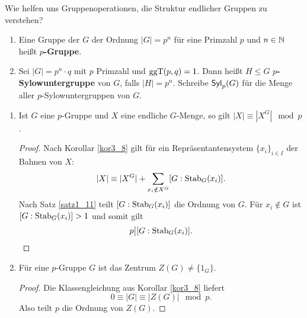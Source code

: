 \begin{leftbar}
	{Wie helfen uns Gruppenoperationen, die Struktur endlicher Gruppen zu verstehen?}
\end{leftbar}
\begin{definition}\label{definiton3_10}
	\begin{enumerate}[label=(\alph*)]
		\item Eine Gruppe der $G$ der Ordnung $|G| = p^n$ für eine Primzahl $p$ und $n \in \mathbb{N}$ heißt \textbf{$p$-Gruppe}.
		\item Sei $|G| = p^n \cdot q$ mit $p$ Primzahl und $\mathrm{ggT}(p,q) = 1$. Dann heißt $H \leq G$ \textbf{$p$-Sylowuntergruppe} von $G$, falls $|H| = p^n$. Schreibe $\mathsf{Syl}_p(G)$ für die Menge aller $p$-Sylowuntergruppen von $G$.
	\end{enumerate}
\end{definition}
\begin{rem}\label{rem3_11}
\begin{enumerate}[label=(\roman*)]
	\item 	Ist $G$ eine $p$-Gruppe und $X$ eine endliche $G$-Menge, so gilt $|X| \equiv |X^G| \mod p$.
	\begin{proof}
		Nach Korollar \ref{kor3_8} gilt für ein Repräsentantensystem $\{x_i\}_{i \in I}$ der Bahnen von $X$:
		\[|X| \equiv |X^G| + \sum_{x_i \notin X^G} [G : \mathrm{Stab}_G(x_i)].\]
			Nach Satz \ref{satz1_11} teilt $[G: \mathrm{Stab}_G(x_i) ]$ die Ordnung von $G$. Für $x_i \notin G$ ist $[G : \mathrm{Stab}_G(x_i)] > 1$ und somit gilt
			\[p \big| [G : \mathrm{Stab}_G(x_i)].\]
	\end{proof}
	\item Für eine $p$-Gruppe $G$ ist das Zentrum $Z(G) \neq \{1_G\}$.
	\begin{proof}
		Die Klassengleichung aus Korollar \ref{kor3_8} liefert 
		\[0 \equiv |G| \equiv |Z(G)| \mod p.\]
		Also teilt $p$ die Ordnung von $Z(G)$.
	\end{proof}	
\end{enumerate}
\end{rem}
